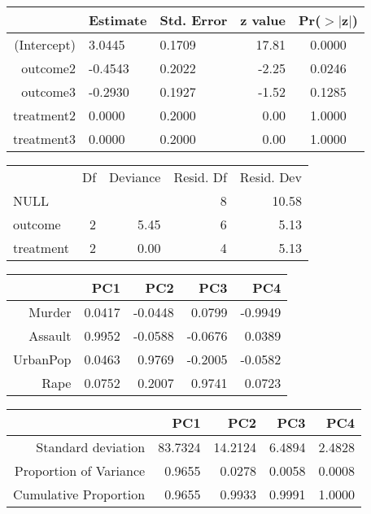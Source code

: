 \documentclass[10pt, fullpage, a4paper, titlepage]{article}
\begin{document}
\begin{table}[ht]
\centering
\begin{tabular}{|r||llrc|}
  \hline
 & Estimate & Std. Error & z value & Pr($>$$|$z$|$) \\ 
  \hline
(Intercept) & 3.0445 & 0.1709 & 17.81 & 0.0000 \\ 
  outcome2 & -0.4543 & 0.2022 & -2.25 & 0.0246 \\ 
  outcome3 & -0.2930 & 0.1927 & -1.52 & 0.1285 \\ 
  treatment2 & 0.0000 & 0.2000 & 0.00 & 1.0000 \\ 
  treatment3 & 0.0000 & 0.2000 & 0.00 & 1.0000 \\ 
   \hline
\end{tabular}
\end{table}
\begin{table}[ht]
\centering
{\small
\begin{tabular}{lrrrr}
  & Df & Deviance & Resid. Df & Resid. Dev \\ 
 NULL &  &  & 8 & 10.58 \\ 
   \hline
outcome & 2 & 5.45 & 6 & 5.13 \\ 
  treatment & 2 & 0.00 & 4 & 5.13 \\ 
  \end{tabular}
}
\end{table}
\begin{table}[ht]
\centering
\begin{tabular}{rrrrr}
  \hline
 & PC1 & PC2 & PC3 & PC4 \\ 
  \hline
Murder & 0.0417 & -0.0448 & 0.0799 & -0.9949 \\ 
  Assault & 0.9952 & -0.0588 & -0.0676 & 0.0389 \\ 
  UrbanPop & 0.0463 & 0.9769 & -0.2005 & -0.0582 \\ 
  Rape & 0.0752 & 0.2007 & 0.9741 & 0.0723 \\ 
   \hline
\end{tabular}
\end{table}
\begin{table}[ht]
\centering
\begin{tabular}{rrrrr}
  \hline
 & PC1 & PC2 & PC3 & PC4 \\ 
  \hline
Standard deviation & 83.7324 & 14.2124 & 6.4894 & 2.4828 \\ 
  Proportion of Variance & 0.9655 & 0.0278 & 0.0058 & 0.0008 \\ 
  Cumulative Proportion & 0.9655 & 0.9933 & 0.9991 & 1.0000 \\ 
   \hline
\end{tabular}
\end{table}
\end{document}
